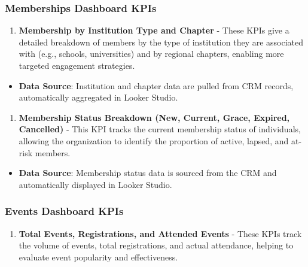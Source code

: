 \documentclass[11pt,a4paper,]{article}
\providecommand{\tightlist}{%
  \setlength{\itemsep}{0pt}\setlength{\parskip}{0pt}}
\begin{document}
\subsubsection{Memberships Dashboard KPIs}\label{memberships-dashboard-kpis}

\begin{enumerate}
\def\labelenumi{\arabic{enumi}.}
\setcounter{enumi}{4}
\tightlist
\item
  \textbf{Membership by Institution Type and Chapter} - These KPIs give a detailed breakdown of members by the type of institution they are associated with (e.g., schools, universities) and by regional chapters, enabling more targeted engagement strategies.
\end{enumerate}

\begin{itemize}
\tightlist
\item
  \textbf{Data Source}: Institution and chapter data are pulled from CRM records, automatically aggregated in Looker Studio.
\end{itemize}

\begin{enumerate}
\def\labelenumi{\arabic{enumi}.}
\setcounter{enumi}{5}
\tightlist
\item
  \textbf{Membership Status Breakdown (New, Current, Grace, Expired, Cancelled)} - This KPI tracks the current membership status of individuals, allowing the organization to identify the proportion of active, lapsed, and at-risk members.
\end{enumerate}

\begin{itemize}
\tightlist
\item
  \textbf{Data Source}: Membership status data is sourced from the CRM and automatically displayed in Looker Studio.
\end{itemize}

\subsubsection{Events Dashboard KPIs}\label{events-dashboard-kpis}

\begin{enumerate}
\def\labelenumi{\arabic{enumi}.}
\setcounter{enumi}{7}
\tightlist
\item
  \textbf{Total Events, Registrations, and Attended Events} - These KPIs track the volume of events, total registrations, and actual attendance, helping to evaluate event popularity and effectiveness.
\end{enumerate}
\end{document}
